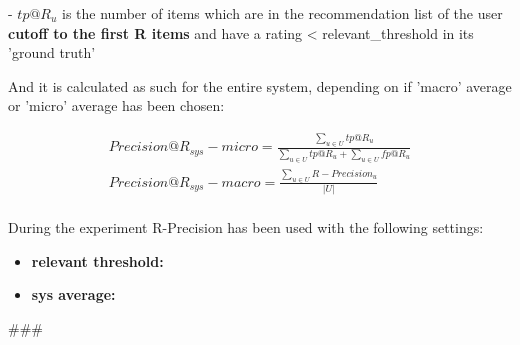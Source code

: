    - $tp@R_u$ is the number of items which are in the recommendation list of the user
      \textbf{cutoff to the first R items} and have a rating < relevant_threshold in its 'ground truth'

\hfill\break

And it is calculated as such for the entire system, depending on if 'macro' average or 'micro' average has been
chosen:

    \begin{gather*}
        Precision@R_{sys} - micro = \frac{\sum_{u \in U} tp@R_u}{\sum_{u \in U} tp@R_u + \sum_{u \in U} fp@R_u}\\
        Precision@R_{sys} - macro = \frac{\sum_{u \in U} R-Precision_u}{|U|}\\
    \end{gather*}

\hfill\break

During the experiment R-Precision has been used with the following settings:
\begin{itemize}
    \item \textbf{relevant threshold: }
    \item \textbf{sys average:  }
\end{itemize}












###